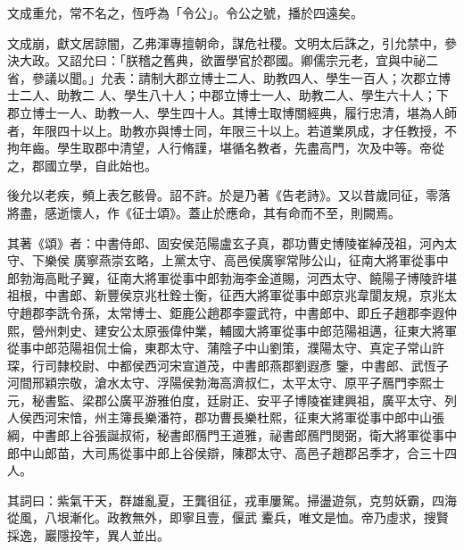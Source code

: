 \begin{pinyinscope}
 文成重允，常不名之，恆呼為「令公」。令公之號，播於四遠矣。



 文成崩，獻文居諒闇，乙弗渾專擅朝命，謀危社稷。文明太后誅之，引允禁中，參決大政。又詔允曰：「朕稽之舊典，欲置學官於郡國。卿儒宗元老，宜與中祕二省，參議以聞。」允表：請制大郡立博士二人、助教四人、學生一百人；次郡立博士二人、助教二
 人、學生八十人；中郡立博士一人、助教二人、學生六十人；下郡立博士一人、助教一人、學生四十人。其博士取博關經典，履行忠清，堪為人師者，年限四十以上。助教亦與博士同，年限三十以上。若道業夙成，才任教授，不拘年齒。學生取郡中清望，人行脩謹，堪循名教者，先盡高門，次及中等。帝從之，郡國立學，自此始也。



 後允以老疾，頻上表乞骸骨。詔不許。於是乃著《告老詩》。又以昔歲同征，零落將盡，感逝懷人，作《征士頌》。蓋止於應命，其有命而不至，則闕焉。



 其著《頌》者：中書侍郎、固安侯范陽盧玄子真，郡功曹史博陵崔綽茂祖，河內太守、下樂侯
 廣寧燕崇玄略，上黨太守、高邑侯廣寧常陟公山，征南大將軍從事中郎勃海高毗子翼，征南大將軍從事中郎勃海李金道賜，河西太守、饒陽子博陵許堪祖根，中書郎、新豐侯京兆杜銓士衡，征西大將軍從事中郎京兆韋閬友規，京兆太守趙郡李詵令孫，太常博士、鉅鹿公趙郡李靈武符，中書郎中、即丘子趙郡李遐仲熙，營州刺史、建安公太原張偉仲業，輔國大將軍從事中郎范陽祖邁，征東大將軍從事中郎范陽祖侃士倫，東郡太守、蒲陰子中山劉策，濮陽太守、真定子常山許琛，行司隸校尉、中都侯西河宋宣道茂，中書郎燕郡劉遐彥
 鑒，中書郎、武恆子河間邢穎宗敬，滄水太守、浮陽侯勃海高濟叔仁，太平太守、原平子鴈門李熙士元，秘書監、梁郡公廣平游雅伯度，廷尉正、安平子博陵崔建興祖，廣平太守、列人侯西河宋愔，州主簿長樂潘符，郡功曹長樂杜熙，征東大將軍從事中郎中山張綱，中書郎上谷張誕叔術，秘書郎鴈門王道雅，祕書郎鴈門閔弼，衛大將軍從事中郎中山郎苗，大司馬從事中郎上谷侯辯，陳郡太守、高邑子趙郡呂季才，合三十四人。



 其詞曰：紫氣干天，群雄亂夏，王龔徂征，戎車屢駕。掃盪遊氛，克剪妖霸，四海從風，八垠漸化。政教無外，即寧且壹，偃武
 櫜兵，唯文是恤。帝乃虛求，搜賢採逸，巖隱投竿，異人並出。




\end{pinyinscope}
